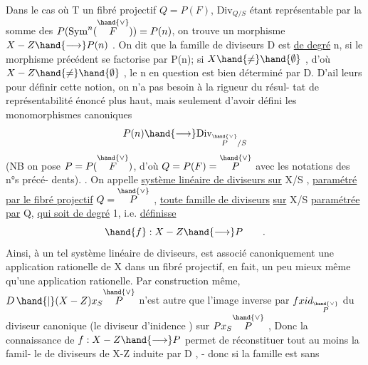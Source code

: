 Dans le cas où T  un fibré projectif $Q=P(F)$, $\mathrm{Div}_{Q/S}$
étant représentable par la somme des $P(\mathrm{Sym}^n(\overset{\hand{\vee}}{F})) = P(n)$, on trouve
un morphisme $X-Z \hand{\longrightarrow} P(n)$ . On dit que la famille de diviseurs
D est \uline{de degré} n, si le morphisme précédent se factorise par P(n); si
$X \hand{\neq} \hand{\emptyset}$ , d'où $X-Z \hand{\neq} \hand{\emptyset}$ , le n en question est bien déterminé par D. D'ail%
leurs pour définir cette notion, on n'a pas besoin à la rigueur du résul-%
tat de représentabilité énoncé plus haut, mais seulement d'avoir défini
les monomorphismes canoniques
\[ P(n) \hand{\longrightarrow} \mathrm{Div}_{\overset{\hand{\vee}}{P}/S} \]
(NB on pose $P = P(\overset{\hand{\vee}}{F})$, d'où $Q = P(F) = \overset{\hand{\vee}}{P}$ avec les notations des n°s précé-%
dents). . On appelle \uline{système linéaire de diviseurs sur} X/S , \uline{paramétré
par le fibré projectif} $Q = \overset{\hand{\vee}}{P}$ , \uline{toute famille de diviseurs} \uline{sur} X/S
\uline{paramétrée par} Q, \uline{qui soit de degré} 1, i.e. \uline{définisse}
\[ \hand{f} : X-Z \hand{\longrightarrow} P \qquad . \]
Ainsi, à un tel système  linéaire de diviseurs, est associé canoniquement
une application rationelle de X dans un fibré projectif, \hand{(}en fait, un peu
mieux même qu'une application rationelle\hand{)}. Par construction même,
$D\,\hand{|}(X-Z)x_S\overset{\hand{\vee}}{P}$ n'est autre que l'image inverse par $f x id_{\overset{\hand{\vee}}{P}}$ du diviseur
canonique (le diviseur d'inidence ) sur $Px_S\overset{\hand{\vee}}{P}$ , Donc la connaissance
de $f: X-Z \hand{\longrightarrow} P$ permet de réconstituer  tout au moins la famil-%
le de diviseurs de X-Z induite par D , - donc si la famille est sans
